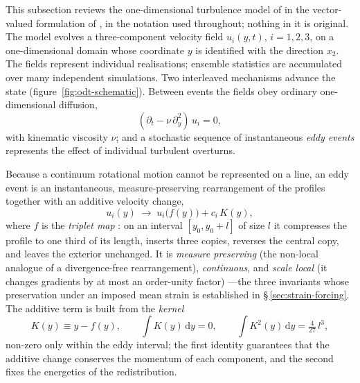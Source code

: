 \documentclass[lineno]{JFM-FLM_Au}
\begin{document}
This subsection reviews the one-dimensional turbulence model of
\citet{Kerstein1999} in the vector-valued formulation of
\citet{Kerstein2001}, in the notation used throughout; nothing in it is
original. The model evolves a three-component velocity field $u_i(y,t)$,
$i=1,2,3$, on a one-dimensional domain whose coordinate $y$ is identified
with the direction $x_2$. The fields represent individual realisations;
ensemble statistics are accumulated over many independent simulations.
Two interleaved mechanisms advance the state
(figure~\ref{fig:odt-schematic}). Between events the fields
obey ordinary one-dimensional diffusion,
\begin{equation}
  (\partial_t-\nu\,\partial_y^2)\,u_i=0,
  \label{eq:odt-diffusion}
\end{equation}
with kinematic viscosity $\nu$; and a stochastic sequence of
instantaneous \emph{eddy events} represents the effect of individual
turbulent overturns.


Because a continuum rotational motion cannot be represented on a line, an
eddy event is an instantaneous, measure-preserving rearrangement of the
profiles together with an additive velocity change,
\begin{equation}
  u_i(y)\;\longrightarrow\;u_i\!\big(f(y)\big)+c_i\,K(y),
  \label{eq:event}
\end{equation}
where $f$ is the \emph{triplet map}
\citep{Kerstein1991,Kerstein1999}: on an interval $[y_0,y_0+l]$ of size
$l$ it compresses the profile to one third of its length, inserts three
copies, reverses the central copy, and leaves the exterior unchanged.
It is \emph{measure preserving} (the non-local analogue of a
divergence-free rearrangement), \emph{continuous}, and \emph{scale
local} (it changes gradients by at most an order-unity factor)
\citep{Kerstein2001}---the
three invariants whose preservation under an imposed mean strain is
established in \S\,\ref{sec:strain-forcing}. The additive term is built
from the \emph{kernel}
\begin{equation}
  K(y)\equiv y-f(y),
  \qquad
  \int K(y)\,\mathrm{d}y = 0,
  \qquad
  \int K^2(y)\,\mathrm{d}y = \tfrac{4}{27}\,l^{3},
  \label{eq:kernel-identities}
\end{equation}
non-zero only within the eddy interval; the first identity guarantees
that the additive change conserves the momentum of each component, and
the second fixes the energetics of the redistribution.
\end{document}
